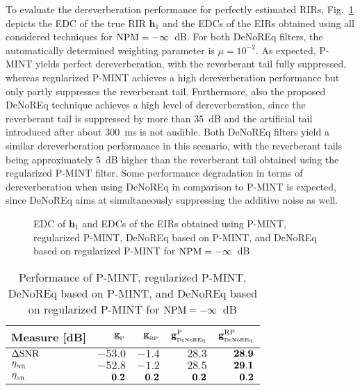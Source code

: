 \documentclass{article}
\begin{document}
To evaluate the dereverberation performance for perfectly estimated RIRs, Fig.~\ref{fig: edc1} depicts the EDC of the true RIR $\mathbf{h}_1$ and the EDCs of the EIRs obtained using all considered techniques for $\rm{NPM} = -\infty$~dB.
For both DeNoREq filters, the automatically determined weighting parameter is $\mu = 10^{-2}$.
As expected, P-MINT yields perfect dereverberation, with the reverberant tail fully suppressed, whereas regularized P-MINT achieves a high dereverberation performance but only partly suppresses the reverberant tail.
Furthermore, also the proposed DeNoREq technique achieves a high level of dereverberation, since the reverberant tail is suppressed by more than $35$~dB and the artificial tail introduced after about $300$~ms is not audible.
Both DeNoREq filters  yield a similar dereverberation performance in this scenario, with the reverberant tails being approximately $5$~dB higher than the reverberant tail obtained using the regularized P-MINT filter.
Some performance degradation in terms of dereverberation when using DeNoREq in comparison to P-MINT is expected, since DeNoREq aims at simultaneously suppressing the additive noise as well. 
\begin{figure}[t!]
  
  \vspace{-0.22cm}
  \caption{EDC of $\mathbf{h}_1$ and EDCs of the EIRs obtained using P-MINT, regularized P-MINT, DeNoREq based on P-MINT, and DeNoREq based on regularized P-MINT for ${\rm NPM} = -\infty$~dB}
  \label{fig: edc1}
\end{figure}%
\begin{table}[t]
\centering
\begin{tabular}{|l|r|r|r|r|}
  \hline
  Measure [dB] & {\footnotesize $\mathbf{g}_{_{\rm P}}$} & {\footnotesize $\mathbf{g}_{_{\rm RP}}$} & {\footnotesize $\mathbf{g}_{_{\rm DeNoREq}}^{\rm P}$} & {\footnotesize $\mathbf{g}_{_{\rm DeNoREq}}^{\rm RP}$} \\
  \hline
  $\Delta {\rm SNR}$ & $-53.0$ & $-1.4$ & $28.3$ & $\bf 28.9$ \\
  \hline
  $\eta_{_{\rm NR}}$ & $-52.8$ & $-1.2$ & $28.5$ & $\bf 29.1$ \\
  \hline
  $\eta_{_{\rm SR}}$ & $\bf 0.2$ & $\bf 0.2$ & $\bf 0.2$ & $\bf 0.2$ \\
  \hline
\end{tabular}
\vspace{-0.1cm}
\caption{Performance of P-MINT, regularized P-MINT, DeNoREq based on P-MINT, and DeNoREq based on regularized P-MINT for ${\rm NPM} = -\infty$~dB}
\label{tbl: 1}
\vspace{-0.4cm}
\end{table}
\end{document}
